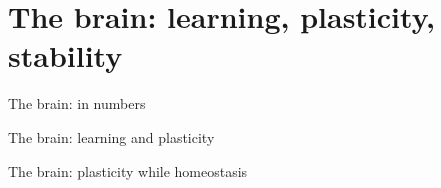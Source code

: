 

\begin{frame}
  \titlepage{}
\end{frame}

\section{The brain: learning, plasticity, stability}
\begin{frame}[c]{The brain: in numbers}
  
\end{frame}
\begin{frame}[c]{The brain: learning and plasticity}
  
\end{frame}

\begin{frame}[c]{The brain: plasticity while homeostasis}
\end{frame}

